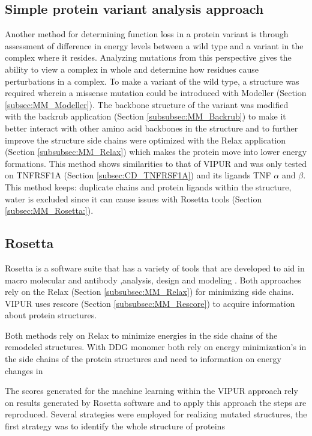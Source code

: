 \subsection{Simple protein variant analysis approach}
Another method for determining function loss in a protein variant is through assessment of difference in energy levels between a wild type and a variant in the complex where it resides. Analyzing mutations from this perspective gives the ability to view a complex in whole and determine how residues cause perturbations in a complex. To make a variant of the wild type, a structure was required wherein a missense mutation could be introduced with Modeller (Section \ref{subsec:MM_Modeller}). The backbone structure of the variant was modified with the backrub application (Section \ref{subsubsec:MM_Backrub}) to make it better interact with other amino acid backbones in the structure and to further improve the structure side chains were optimized with the Relax application (Section \ref{subsubsec:MM_Relax}) which makes the protein move into lower energy formations. This method shows similarities to that of VIPUR and was only tested on TNFRSF1A (Section \ref{subsec:CD_TNFRSF1A}) and its ligands TNF $\alpha$ and $\beta$. This method keeps: duplicate chains and protein ligands within the structure, water is excluded since it can cause issues with Rosetta tools (Section \ref{subsec:MM_Rosetta:}).
\label{}

\subsection{Rosetta}
Rosetta is a software suite that has a variety of tools that are developed to aid in macro molecular and antibody ,analysis, design and modeling \cite{}.
Both approaches rely on the Relax (Section \ref{subsubsec:MM_Relax}) for minimizing side chains. VIPUR uses rescore (Section \ref{subsubsec:MM_Rescore}) to acquire information about protein structures.

Both methods rely on Relax  to minimize energies in the side chains of the remodeled structures. With  DDG monomer  both rely on energy minimization's  in the side chains of the protein structures and need to information on energy changes in 

The scores generated for the machine learning within the VIPUR approach rely on results generated by Rosetta software and to apply this approach the steps are reproduced.  
Several strategies were employed for realizing mutated structures, the first strategy was to identify the whole structure of proteins


